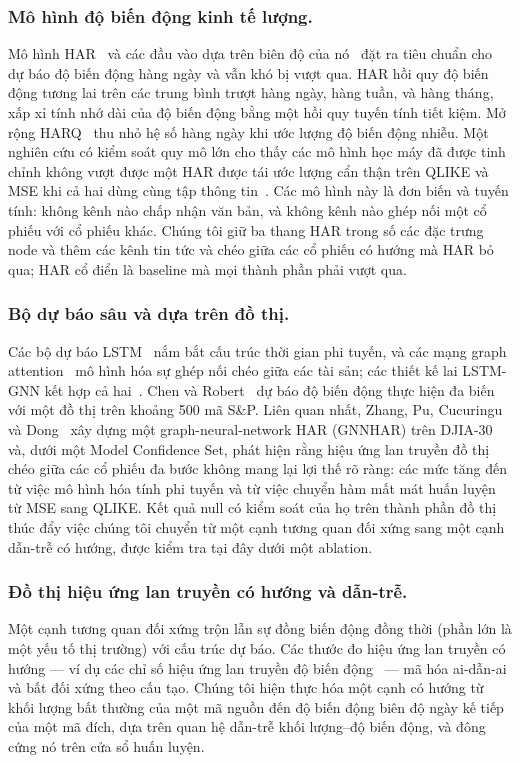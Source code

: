 \documentclass[runningheads]{llncs}
\begin{document}
\subsubsection{Mô hình độ biến động kinh tế lượng.}
Mô hình HAR~\cite{corsi2009} và các đầu vào dựa trên biên độ của nó~\cite{parkinson1980} đặt ra tiêu
chuẩn cho dự báo độ biến động hàng ngày và vẫn khó bị vượt qua. HAR hồi quy độ biến động tương lai trên
các trung bình trượt hàng ngày, hàng tuần, và hàng tháng, xấp xỉ tính nhớ dài của độ biến động bằng một
hồi quy tuyến tính tiết kiệm. Mở rộng HARQ~\cite{bpq2016} thu nhỏ hệ số hàng ngày khi ước lượng độ biến
động nhiễu. Một nghiên cứu có kiểm soát quy mô lớn cho thấy các mô hình học máy đã được tinh chỉnh không
vượt được một HAR được tái ước lượng cẩn thận trên QLIKE và MSE khi cả hai dùng cùng tập
thông tin~\cite{audrino2025}. Các mô hình này là đơn biến và tuyến tính: không kênh nào chấp nhận văn
bản, và không kênh nào ghép nối một cổ phiếu với cổ phiếu khác. Chúng tôi giữ ba thang HAR trong số các
đặc trưng node và thêm các kênh tin tức và chéo giữa các cổ phiếu có hướng mà HAR bỏ qua; HAR cổ điển là
baseline mà mọi thành phần phải vượt qua.

\subsubsection{Bộ dự báo sâu và dựa trên đồ thị.}
Các bộ dự báo LSTM~\cite{hochreiter1997} nắm bắt cấu trúc thời gian phi tuyến, và các mạng graph
attention~\cite{velickovic2018} mô hình hóa sự ghép nối chéo giữa các tài sản; các thiết kế lai LSTM-GNN
kết hợp cả hai~\cite{sonani2025}. Chen và Robert~\cite{chen2022} dự báo độ biến động thực hiện đa biến
với một đồ thị trên khoảng 500 mã S\&P. Liên quan nhất, Zhang, Pu, Cucuringu và
Dong~\cite{zhang2025gnnhar} xây dựng một graph-neural-network HAR (GNNHAR) trên DJIA-30 và, dưới một
Model Confidence Set, phát hiện rằng hiệu ứng lan truyền đồ thị chéo giữa các cổ phiếu đa bước không mang
lại lợi thế rõ ràng: các mức tăng đến từ việc mô hình hóa tính phi tuyến và từ việc chuyển hàm mất mát
huấn luyện từ MSE sang QLIKE. Kết quả null có kiểm soát của họ trên thành phần đồ thị thúc đẩy việc chúng
tôi chuyển từ một cạnh tương quan đối xứng sang một cạnh dẫn-trễ có hướng, được kiểm tra tại đây dưới một
ablation.

\subsubsection{Đồ thị hiệu ứng lan truyền có hướng và dẫn-trễ.}
Một cạnh tương quan đối xứng trộn lẫn sự đồng biến động đồng thời (phần lớn là một yếu tố thị trường) với
cấu trúc dự báo. Các thước đo hiệu ứng lan truyền có hướng --- ví dụ các chỉ số hiệu ứng lan truyền độ
biến động~\cite{diebold2012} --- mã hóa ai-dẫn-ai và bất đối xứng theo cấu tạo. Chúng tôi hiện thực hóa
một cạnh có hướng từ khối lượng bất thường của một mã nguồn đến độ biến động biên độ ngày kế tiếp của một
mã đích, dựa trên quan hệ dẫn-trễ khối lượng--độ biến động, và đông cứng nó trên cửa sổ huấn luyện.
\end{document}
